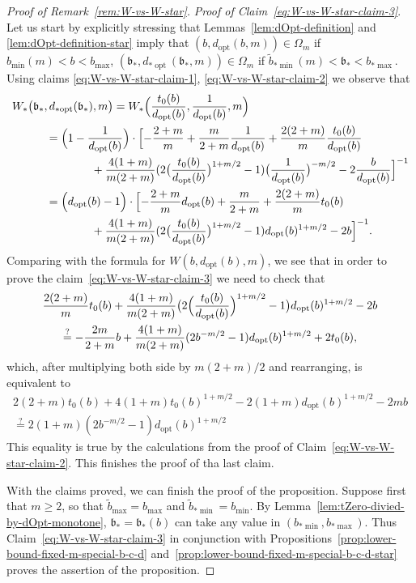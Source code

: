 \documentclass[a4paper]{amsart} %
\theoremstyle{definition}
\theoremstyle{remark}
\numberwithin{equation}{section}
\newcommand*{\specialbd}[1]{\Omega_{#1}}
\newcommand*{\XXXspecialbd}{W}
\newcommand*{\XXXspecialbdStar}{W_*}
\newcommand*{\bMin}{b_{\min}}
\newcommand*{\bMax}{b_{\max}}
\newcommand*{\dOpt}{d_{\mathrm{opt}}}
\newcommand*{\bMinStar}{b_{*\!\min}}
\newcommand*{\bMaxStar}{b_{*\!\max}}
\newcommand*{\dOptStar}{d_{*\!\operatorname{opt}}}
\newcommand*{\bMaxTilde}{\widetilde{b}_{\max}}
\newcommand*{\bMinTildeStar}{\widetilde{b}_{*\!\min}}
\newcommand*{\bStarWvsWStar}{\mathfrak{b}_*}
\begin{document}
\begin{proof}[Proof of Remark~\ref{rem:W-vs-W-star}]
	
	\emph{Proof of Claim~\eqref{eq:W-vs-W-star-claim-3}}.
	Let us start by explicitly stressing that  Lemmas~\ref{lem:dOpt-definition} 
	and
	\ref{lem:dOpt-definition-star}
	imply that $(b, \dOpt(b,m))\in\specialbd{m}$ if $\bMin(m) < b < \bMax$,
	$(\bStarWvsWStar, \dOptStar(\bStarWvsWStar,m))\in\specialbd{m}$ if $\bMinTildeStar(m) < \bStarWvsWStar < \bMaxStar$.
	Using claims \eqref{eq:W-vs-W-star-claim-1}, \eqref{eq:W-vs-W-star-claim-2} we observe that
	\begin{align*}
	\MoveEqLeft[3]\XXXspecialbdStar\bigl(
	\bStarWvsWStar,
	\dOptStar(\bStarWvsWStar),
	m\bigr)
	=\XXXspecialbdStar\Bigl(
	\frac{t_0(b)}{\dOpt(b)},\frac{1}{\dOpt(b)}, m\Bigr)\\
	& = \Bigl(1-\frac{1}{\dOpt(b)}\Bigr)\cdot
	\Bigl[-\frac{2+m}{m}  + \frac{m}{2+m}\frac{1}{\dOpt(b)} + \frac{2(2+m)}{m}\frac{t_0(b)}{\dOpt(b)} \\
	& \qquad\qquad +
	\frac{4(1+m)}{m(2+m)}(2\bigl( \frac{t_0(b)}{\dOpt(b)}\bigr)^{1+m/2}  -1)\bigl(\frac{1}{\dOpt(b)}\bigr)^{-m/2} 
	- 2\frac{b}{\dOpt(b)}\Bigr]^{-1}\\
	& = \Bigl(\dOpt(b) -1\Bigr)\cdot
	\Bigl[-\frac{2+m}{m}\dOpt(b)  + \frac{m}{2+m} 
	+ \frac{2(2+m)}{m}t_0(b) \\
	&\qquad\qquad+
	\frac{4(1+m)}{m(2+m)}(2\bigl( \frac{t_0(b)}{\dOpt(b)}\bigr)^{1+m/2}  -1)\dOpt(b)^{1+m/2} 
	- 2b \Bigr]^{-1}.
	\end{align*}
	Comparing with the formula for $\XXXspecialbd(b,\dOpt(b),m)$,
	we see that in order to prove the claim~\eqref{eq:W-vs-W-star-claim-3}
	we need to check that
	\begin{multline*}
	\frac{2(2+m)}{m}t_0(b) +
	\frac{4(1+m)}{m(2+m)}\bigl(2\Bigl( \frac{t_0(b)}{\dOpt(b)}\Bigr)^{1+m/2}  -1\bigr)\dOpt(b)^{1+m/2} 
	- 2b\\
	\overset{?}{=}
	- \frac{2m}{2+m}b +
	\frac{4(1+m)}{m(2+m)}(2b^{-m/2}  -1)\dOpt(b)^{1+m/2} 
	+2t_0(b),
	\end{multline*}
	which, after multiplying both side by $m(2+m)/2$ and rearranging,
	is equivalent to
	\begin{multline*}
	2(2+m)t_0(b) +	4(1+m) t_0(b)^{1+m/2} - 2(1+m)\dOpt(b)^{1+m/2} -2mb\\
	\overset{?}{=}	 2(1+m)(2b^{-m/2}  -1)\dOpt(b)^{1+m/2} 
	\end{multline*}
	This equality is true by the calculations from the proof of Claim~\eqref{eq:W-vs-W-star-claim-2}.
	This finishes the proof of tha last claim.
	
	With the claims proved, we can finish the proof of the proposition.
	Suppose first that $m\geq 2$, so that $\bMaxTilde = \bMax$ and $\bMinTildeStar = \bMin$.
	By Lemma~\ref{lem:tZero-divied-by-dOpt-monotone},
	$\bStarWvsWStar = \bStarWvsWStar(b)$ can take any value in $(\bMinStar, \bMaxStar)$. 
	Thus Claim~\eqref{eq:W-vs-W-star-claim-3}
	in conjunction with Propositions~\ref{prop:lower-bound-fixed-m-special-b-c-d} 
	and~\ref{prop:lower-bound-fixed-m-special-b-c-d-star}
	proves the assertion of the proposition.
	

\end{proof}
\end{document}
